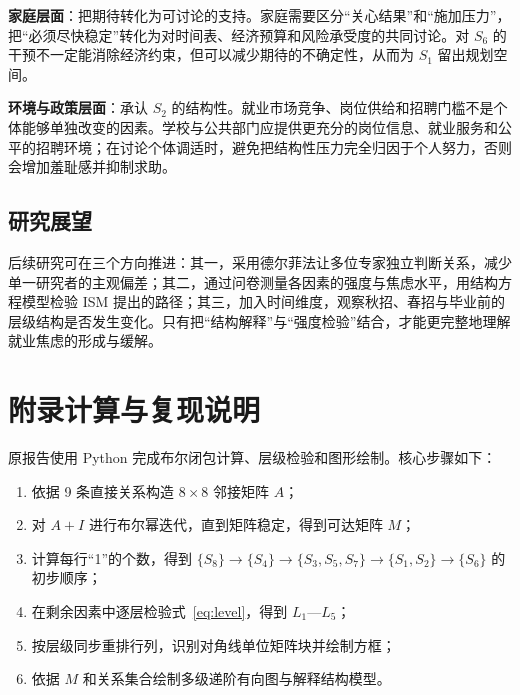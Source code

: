 \documentclass[UTF8,a4paper,zihao=-4]{ctexart}
\newcommand{\factor}[1]{\ensuremath{S_{#1}}}
\newcommand{\lev}[1]{\ensuremath{L_{#1}}}
\begin{document}
\textbf{家庭层面}：把期待转化为可讨论的支持。家庭需要区分“关心结果”和“施加压力”，把“必须尽快稳定”转化为对时间表、经济预算和风险承受度的共同讨论。对 \factor{6} 的干预不一定能消除经济约束，但可以减少期待的不确定性，从而为 \factor{1} 留出规划空间。

\textbf{环境与政策层面}：承认 \factor{2} 的结构性。就业市场竞争、岗位供给和招聘门槛不是个体能够单独改变的因素。学校与公共部门应提供更充分的岗位信息、就业服务和公平的招聘环境；在讨论个体调适时，避免把结构性压力完全归因于个人努力，否则会增加羞耻感并抑制求助。

\subsection{研究展望}

后续研究可在三个方向推进：其一，采用德尔菲法让多位专家独立判断关系，减少单一研究者的主观偏差；其二，通过问卷测量各因素的强度与焦虑水平，用结构方程模型检验 ISM 提出的路径；其三，加入时间维度，观察秋招、春招与毕业前的层级结构是否发生变化。只有把“结构解释”与“强度检验”结合，才能更完整地理解就业焦虑的形成与缓解。

\Needspace{60mm}
\section*{附录\enskip 计算与复现说明}

原报告使用 Python 完成布尔闭包计算、层级检验和图形绘制。核心步骤如下：

\begin{enumerate}[label=\arabic*.]

  \item 依据 9 条直接关系构造 \(8 \times 8\) 邻接矩阵 \(A\)；

  \item 对 \(A+I\) 进行布尔幂迭代，直到矩阵稳定，得到可达矩阵 \(M\)；

  \item 计算每行“1”的个数，得到 \(\{S_8\}\to\{S_4\}\to\{S_3,S_5,S_7\}\to\{S_1,S_2\}\to\{S_6\}\) 的初步顺序；

  \item 在剩余因素中逐层检验式~\eqref{eq:level}，得到 \lev{1}—\lev{5}；

  \item 按层级同步重排行列，识别对角线单位矩阵块并绘制方框；

  \item 依据 \(M\) 和关系集合绘制多级递阶有向图与解释结构模型。

\end{enumerate}
\end{document}
